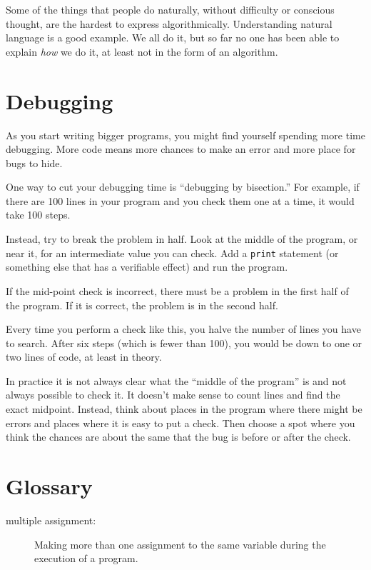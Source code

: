 \documentclass[10pt]{book}
\begin{document}
\begin{CJK}{UTF8}{gbsn}
Some of the things that people do naturally, without difficulty or
conscious thought, are the hardest to express algorithmically.
Understanding natural language is a good example.  We all do it, but
so far no one has been able to explain {\em how} we do it, at least
not in the form of an algorithm.


\section{Debugging}

As you start writing bigger programs, you might find yourself
spending more time debugging.  More code means more chances to
make an error and more place for bugs to hide.

One way to cut your debugging time is ``debugging by bisection.''
For example, if there are 100 lines in your program and you
check them one at a time, it would take 100 steps.

Instead, try to break the problem in half.  Look at the middle
of the program, or near it, for an intermediate value you
can check.  Add a {\tt print} statement (or something else
that has a verifiable effect) and run the program.

If the mid-point check is incorrect, there must be a problem in the
first half of the program.  If it is correct, the problem is
in the second half.

Every time you perform a check like this, you halve the number of
lines you have to search.  After six steps (which is fewer than 100),
you would be down to one or two lines of code, at least in theory.

In practice it is not always clear what
the ``middle of the program'' is and not always possible to
check it.  It doesn't make sense to count lines and find the
exact midpoint.  Instead, think about places
in the program where there might be errors and places where it
is easy to put a check.  Then choose a spot where you
think the chances are about the same that the bug is before
or after the check.




\section{Glossary}

\begin{description}

\item[multiple assignment:] Making more than one assignment to the same
variable during the execution of a program.


\end{description}
\end{CJK}
\end{document}
